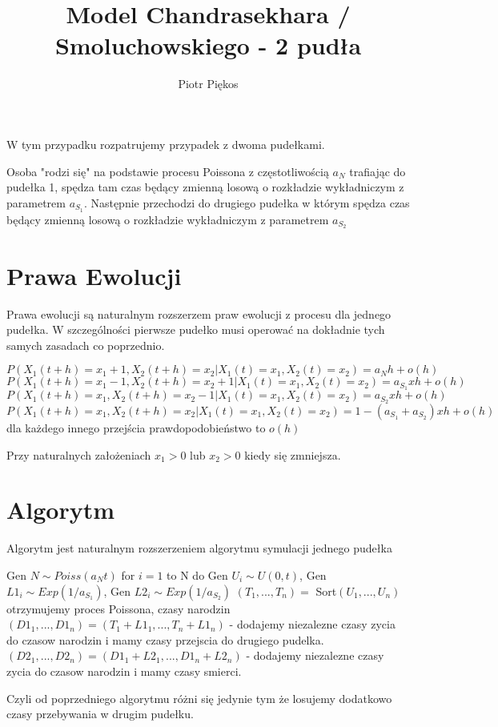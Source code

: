 \documentclass{article}
\begin{document}
\title{Model Chandrasekhara / Smoluchowskiego  - 2 pudła}
\author{Piotr Piękos}

\maketitle

W tym przypadku rozpatrujemy przypadek z dwoma pudełkami. 

Osoba "rodzi się" na podstawie procesu Poissona z częstotliwością $a_N$ trafiając do pudełka 1, spędza tam czas będący zmienną losową o rozkładzie wykładniczym z parametrem $a_{S_1}$. Następnie przechodzi do drugiego pudełka w którym spędza czas będący zmienną losową o rozkładzie wykładniczym z parametrem $a_{S_2}$
\section{Prawa Ewolucji}

Prawa ewolucji są naturalnym rozszerzem praw ewolucji z procesu dla jednego pudełka. W szczególności pierwsze pudełko musi operować na dokładnie tych samych zasadach co poprzednio.

\[P(X_1(t+h) = x_1 + 1, X_2(t+h)=x_2 | X_1(t) = x_1, X_2(t) = x_2) = a_N h + o(h)\]
\[P(X_1(t+h) = x_1 - 1, X_2(t+h)=x_2 + 1| X_1(t) = x_1, X_2(t) = x_2) = a_{S_1} xh + o(h)\]
\[P(X_1(t+h) = x_1, X_2(t+h)=x_2 - 1| X_1(t) = x_1, X_2(t) = x_2) = a_{S_2} xh + o(h)\]
\[P(X_1(t+h) = x_1, X_2(t+h)=x_2| X_1(t) = x_1, X_2(t) = x_2) = 1 - (a_{S_1}  + a_{S_2})xh + o(h)\]
dla każdego innego przejścia prawdopodobieństwo to $o(h)$

Przy naturalnych założeniach $x_1 > 0$ lub $x_2 > 0$ kiedy się zmniejsza.

\section{Algorytm}

Algorytm jest naturalnym rozszerzeniem algorytmu symulacji jednego pudełka



\begin{algorithmic}
\State Gen $N \sim \textit{Poiss}(a_Nt)$
\State for $i = 1$ to N do Gen $U_i \sim U(0, t)$, Gen $L1_i \sim \textit{Exp}(1/a_{S_1})$, Gen $L2_i \sim \textit{Exp}(1/a_{S_2})$
\State $(T_1, ..., T_n) =$ Sort$(U_1, ..., U_n)$ otrzymujemy proces Poissona, czasy narodzin
\State $(D1_1, ..., D1_n) = (T_1 + L1_1, ..., T_n + L1_n)$ - dodajemy niezalezne czasy zycia do czasow narodzin i mamy czasy przejscia do drugiego pudelka.
\State $(D2_1, ..., D2_n) = (D1_1 + L2_1, ..., D1_n + L2_n)$ - dodajemy niezalezne czasy zycia do czasow narodzin i mamy czasy smierci.
\end{algorithmic}  

Czyli od poprzedniego algorytmu różni się jedynie tym że losujemy dodatkowo czasy przebywania w drugim pudełku.
\end{document}
